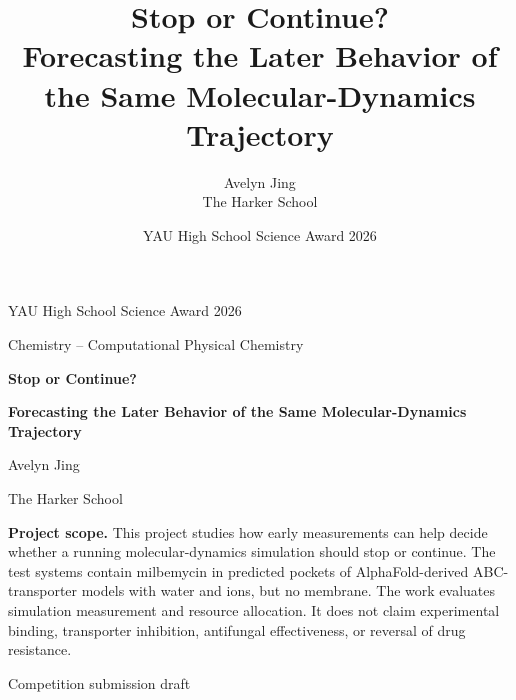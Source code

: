 \documentclass[11pt]{article}
\title{
\textbf{Stop or Continue?}\\[0.4em]
\Large Forecasting the Later Behavior of the Same Molecular-Dynamics Trajectory
}
\author{Avelyn Jing\\The Harker School}
\date{YAU High School Science Award 2026}
\begin{document}
\hypersetup{pageanchor=false}
\begin{titlepage}
    \centering
    \vspace*{1.3cm}
    {\Large YAU High School Science Award 2026\par}
    \vspace{0.25cm}
    {\large Chemistry -- Computational Physical Chemistry\par}
    \vspace{1.6cm}
    {\huge\bfseries Stop or Continue?\par}
    \vspace{0.5cm}
    {\LARGE\bfseries Forecasting the Later Behavior of the Same Molecular-Dynamics Trajectory\par}
    \vspace{1.4cm}
    {\Large Avelyn Jing\par}
    \vspace{0.2cm}
    {\large The Harker School\par}
    \vfill
    \begin{minipage}{0.88\textwidth}
    \small
    \textbf{Project scope.}
    This project studies how early measurements can help decide whether a running molecular-dynamics simulation should stop or continue. The test systems contain milbemycin in predicted pockets of AlphaFold-derived ABC-transporter models with water and ions, but no membrane. The work evaluates simulation measurement and resource allocation. It does not claim experimental binding, transporter inhibition, antifungal effectiveness, or reversal of drug resistance.
    \end{minipage}
    \vfill
    {\large Competition submission draft\par}
\end{titlepage}
\hypersetup{pageanchor=true}
\end{document}
